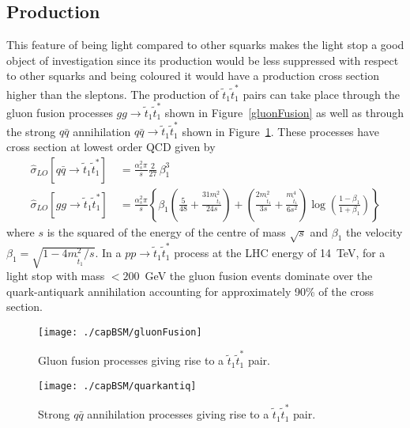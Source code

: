 \subsection{Production}\label{sect:production} 
This feature of being light compared to other squarks makes the light stop a good object of investigation since its production would be less suppressed with respect to other squarks and being coloured it would have a production cross section higher than the sleptons. The production of $\tilde{t}_{1}\tilde{t}_{1}^*$ pairs can take place through the gluon fusion processes $gg\rightarrow\tilde{t}_{1}\tilde{t}_{1}^*$ shown in Figure~\ref{gluonFusion} as well as through the strong $q\bar q$ annihilation $q\bar q\rightarrow\tilde{t}_{1}\tilde{t}_{1}^*$ shown in Figure~\ref{qqbar}. These processes have cross section at lowest order QCD given by \cite{beenakker-1998-515}
\begin{align}
\hat{\sigma}_{LO}[q\bar{q}\rightarrow\tilde{t}_1\tilde{t}_1^*] &\ = \frac{\alpha_s^2 \pi}{s} \frac{2}{27}\,\beta_1^3 \label{eq:Xsectqqbar}\\
\hat{\sigma}_{LO}[gg\rightarrow\tilde{t}_1\tilde{t}_1^*]       &\ = \frac{\alpha_s^2 \pi}{s} \left\{ 
        \beta_1 \left( \frac{5}{48} + \frac{31m_{\tilde{t}_1}^2}{24s} \right)
      + \left( \frac{2m_{\tilde{t}_1}^2}{3s} + \frac{m_{\tilde{t}_1}^4}{6s^2} \right)
        \log\left(\frac{1-\beta_1}{1+\beta_1}\right) \right\} \label{eq:Xsectgg}
\end{align} where $s$ is the squared of the energy of the centre of mass $\sqrt{s}$ and $\beta_1$ the velocity $\beta_1 = \sqrt{1-4m_{\tilde{t}_1}^2/s}$. In a $pp\rightarrow\tilde{t}_{1}\tilde{t}_{1}^*$ process at the LHC energy of 14~TeV, for a light stop with mass $<200$~GeV the gluon fusion events dominate over the quark-antiquark annihilation accounting for approximately 90\% of the cross section.
\begin{figure}[htb]\begin{center}
\texttt{[image: ./capBSM/gluonFusion]}\caption{Gluon fusion processes giving rise to a $\tilde{t}_{1}\tilde{t}_{1}^*$ pair.}\label{gluonFusion}
\texttt{[image: ./capBSM/quarkantiq]}\caption{Strong $q\bar q$ annihilation  processes giving rise to a $\tilde{t}_{1}\tilde{t}_{1}^*$ pair.}\label{qqbar}\end{center}\end{figure}

